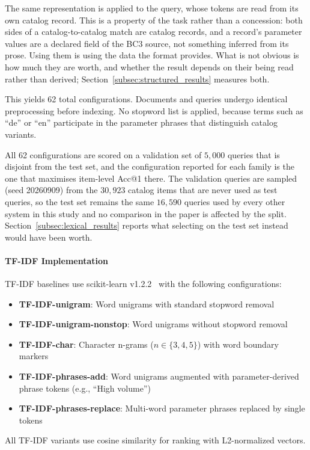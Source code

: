 \documentclass[preprint,12pt]{elsarticle}
\begin{document}
The same representation is applied to the query, whose tokens are read from its own catalog record. This is a property of the task rather than a concession: both sides of a catalog-to-catalog match are catalog records, and a record's parameter values are a declared field of the BC3 source, not something inferred from its prose. Using them is using the data the format provides. What is not obvious is how much they are worth, and whether the result depends on their being read rather than derived; Section~\ref{subsec:structured_results} measures both.

This yields 62 total configurations. Documents and queries undergo identical preprocessing before indexing. No stopword list is applied, because terms such as ``de'' or ``en'' participate in the parameter phrases that distinguish catalog variants.

All 62 configurations are scored on a validation set of $5{,}000$ queries that is disjoint from the test set, and the configuration reported for each family is the one that maximises item-level Acc@1 there. The validation queries are sampled (seed 20260909) from the $30{,}923$ catalog items that are never used as test queries, so the test set remains the same $16{,}590$ queries used by every other system in this study and no comparison in the paper is affected by the split. Section~\ref{subsec:lexical_results} reports what selecting on the test set instead would have been worth.

\paragraph{TF-IDF Implementation}
TF-IDF baselines use scikit-learn v1.2.2~\citep{pedregosa2011scikit} with the following configurations:
\begin{itemize}
    \item \textbf{TF-IDF-unigram}: Word unigrams with standard stopword removal
    \item \textbf{TF-IDF-unigram-nonstop}: Word unigrams without stopword removal
    \item \textbf{TF-IDF-char}: Character n-grams ($n \in \{3,4,5\}$) with word boundary markers
    \item \textbf{TF-IDF-phrases-add}: Word unigrams augmented with parameter-derived phrase tokens (e.g., ``High volume'')
    \item \textbf{TF-IDF-phrases-replace}: Multi-word parameter phrases replaced by single tokens
\end{itemize}
All TF-IDF variants use cosine similarity for ranking with L2-normalized vectors.
\end{document}
